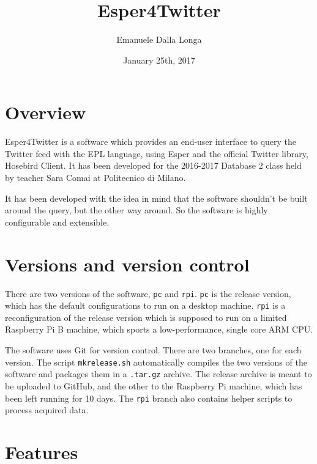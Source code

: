 \documentclass[a4paper]{article}
\title{Esper4Twitter}
\author{Emanuele Dalla Longa}
\date{January 25th, 2017}
\begin{document}
\maketitle
\setlength{\parindent}{1ex}
\section{Overview}
Esper4Twitter is a software which provides an end-user interface to query the Twitter feed with the EPL language, using Esper and the official Twitter library, Hosebird Client. It has been developed for the 2016-2017 Database 2 class held by teacher Sara Comai at Politecnico di Milano.\par
It has been developed with the idea in mind that the software shouldn't be built around the query, but the other way around. So the software is highly configurable and extensible.
\section{Versions and version control}
There are two versions of the software, \lstinline$pc$ and \lstinline$rpi$. \lstinline$pc$ is the release version, which has the default configurations to run on a desktop machine. \lstinline$rpi$ is a reconfiguration of the release version which is supposed to run on a limited Raspberry Pi B machine, which sports a low-performance, single core ARM CPU.\par
The software uses Git for version control. There are two branches, one for each version. The script \lstinline$mkrelease.sh$ automatically compiles the two versions of the software and packages them in a \lstinline$.tar.gz$ archive. The release archive is meant to be uploaded to GitHub, and the other to the Raspberry Pi machine, which has been left running for 10 days. The \lstinline$rpi$ branch also contains helper scripts to process acquired data.
\section{Features}
\end{document}
